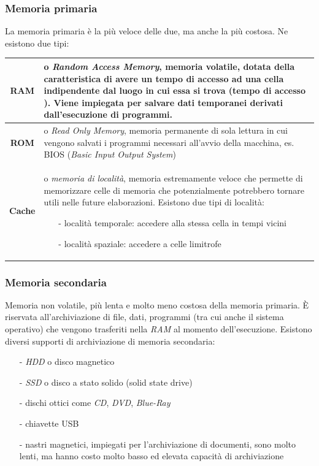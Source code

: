 \documentclass{article}
\begin{document}
\subsubsection*{Memoria primaria}
La memoria primaria è la più veloce delle due, ma anche la più costosa. Ne esistono due tipi:
\begin{center}
	\begin{tabularx}{\textwidth}{c X}
		\textbf{RAM} & o \textit{Random Access Memory}, memoria volatile, dotata della caratteristica di avere un tempo di accesso
		ad una cella indipendente dal luogo in cui essa si trova (tempo di accesso \say{casuale}). Viene impiegata per salvare dati 
		temporanei derivati dall'esecuzione di programmi. \\
		\midrule
		\textbf{ROM} & o \textit{Read Only Memory}, memoria permanente di sola lettura in cui vengono salvati i programmi necessari
		all'avvio della macchina, es. BIOS (\textit{Basic Input Output System}) \\
		\midrule
		\textbf{Cache} & o \textit{memoria di località}, memoria estremamente veloce che permette di memorizzare celle di memoria che
		potenzialmente potrebbero tornare utili nelle future elaborazioni. Esistono due tipi di località:
		\begin{itemize}[topsep=3pt, itemsep=0pt]
			\item[-] località temporale: accedere alla stessa cella in tempi vicini
			\item[-] località spaziale: accedere a celle limitrofe
		\end{itemize}
	\end{tabularx}
\end{center}

\subsubsection*{Memoria secondaria}
Memoria non volatile, più lenta e molto meno costosa della memoria primaria. È riservata all'archiviazione di file, dati,
programmi (tra cui anche il sistema operativo) che vengono trasferiti nella \textit{RAM} al momento dell'esecuzione.
Esistono diversi supporti di archiviazione di memoria secondaria:
\begin{itemize} [topsep=3pt, itemsep=0pt, leftmargin=5pt]
	\item[-] \textit{HDD} o disco magnetico
	\item[-] \textit{SSD} o disco a stato solido (solid state drive)
	\item[-] dischi ottici come \textit{CD}, \textit{DVD}, \textit{Blue-Ray}
	\item[-] chiavette USB
	\item[-] nastri magnetici, impiegati per l'archiviazione di documenti, sono molto lenti, ma hanno costo molto basso ed
	elevata capacità di archiviazione
\end{itemize}
\end{document}
